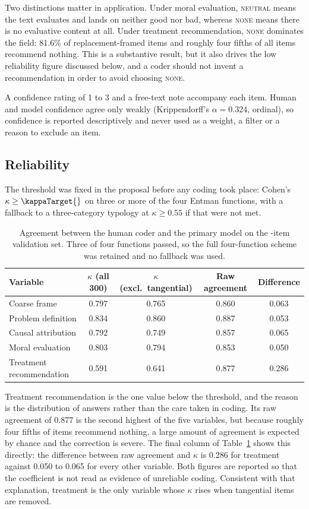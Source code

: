 Two distinctions matter in application. Under moral evaluation,
\textsc{neutral} means the text evaluates and lands on neither good nor bad,
whereas \textsc{none} means there is no evaluative content at all. Under
treatment recommendation, \textsc{none} dominates the field: 81.6\% of
replacement-framed items and roughly four fifths of all items recommend nothing.
This is a substantive result, but it also drives the low reliability figure
discussed below, and a coder should not invent a recommendation in order to
avoid choosing \textsc{none}.

A confidence rating of 1 to 3 and a free-text note accompany each item. Human
and model confidence agree only weakly (Krippendorff's $\alpha = 0.324$,
ordinal), so confidence is reported descriptively and never used as a weight, a
filter or a reason to exclude an item.

\subsection{Reliability}

The threshold was fixed in the proposal before any coding took place: Cohen's
$\kappa \geq \kappaTarget{}$ on three or more of the four Entman functions,
with a fallback to a three-category typology at $\kappa \geq 0.55$ if that were
not met.

\begin{table}[htbp]\centering
\caption{Agreement between the human coder and the primary model on the
\Nval{}-item validation set. Three of four functions passed, so the full
four-function scheme was retained and no fallback was used.}
\label{tab:app-reliability}
\small
\begin{tabular}{lcccc}
\toprule
Variable & $\kappa$ (all 300) & $\kappa$ (excl.\ tangential) & Raw agreement & Difference\\
\midrule
Coarse frame             & 0.797 & 0.765 & 0.860 & 0.063\\
Problem definition       & 0.834 & 0.860 & 0.887 & 0.053\\
Causal attribution       & 0.792 & 0.749 & 0.857 & 0.065\\
Moral evaluation         & 0.803 & 0.794 & 0.853 & 0.050\\
Treatment recommendation & 0.591 & 0.641 & 0.877 & 0.286\\
\bottomrule
\end{tabular}
\end{table}

Treatment recommendation is the one value below the threshold, and the reason is
the distribution of answers rather than the care taken in coding. Its raw
agreement of 0.877 is the second highest of the five variables, but because
roughly four fifths of items recommend nothing, a large amount of agreement is
expected by chance and the correction is severe. The final column of
Table~\ref{tab:app-reliability} shows this directly: the difference between raw
agreement and $\kappa$ is 0.286 for treatment against 0.050 to 0.065 for every
other variable. Both figures are reported so that the coefficient is not read as
evidence of unreliable coding. Consistent with that explanation, treatment is
the only variable whose $\kappa$ rises when tangential items are removed.

